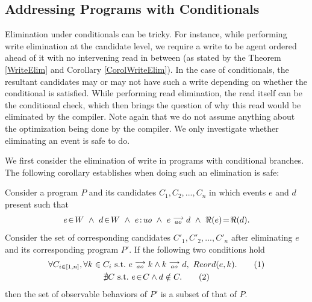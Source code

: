 \subsection{Addressing Programs with Conditionals}
    
    Elimination under conditionals can be tricky. 
    For instance, while performing write elimination at the candidate level, we require a write to be agent ordered ahead of it with no intervening read in between (as stated by the Theorem \ref{WriteElim} and Corollary \ref{CorolWriteElim}).
    In the case of conditionals, the resultant candidates may or may not have such a write depending on whether the conditional is satisfied. 
    While performing read elimination, the read itself can be the conditional check, which then brings the question of why this read would be eliminated by the compiler.
    Note again that we do not assume anything about the optimization being done by the compiler. 
    We only investigate whether eliminating an event is safe to do.  

    We first consider the elimination of write in programs with conditional branches. 
    The following corollary establishes when doing such an elimination is safe: 
    \begin{corollary}
        \label{WriteElimCond}
        Consider a program $P$ and its candidates $C_1, C_2, ... , C_n$ in which events $e$ and $d$ present such that 
        \begin{align*}
            \event{e}{W} \ \wedge \ \event{d}{W} \ \wedge \ \et{e}{uo} \ \wedge \ \reln{e}{ao}{d} \ \wedge \ \Re(e)\!=\!\Re(d).
        \end{align*} 
        Consider the set of corresponding candidates $C'_1, C'_2, ... , C'_n$ after eliminating $e$ and its corresponding program $P'$. If the following two conditions hold
        \begin{gather}
            \forall C_{i \in [1,n]}, \forall k \in C_i \ \text{s.t.} \ \reln{e}{ao}{k} \wedge \reln{k}{ao}{d}, \    
            Reord(e,k). \tag{1} \label{elim:cond_write1}\\   
            \nexists C \ \text{s.t.} \ \event{e}{C} \wedge d \notin C. \tag{2} \label{elim:cond_write2}
        \end{gather}
        then the set of observable behaviors of $P'$ is a subset of that of $P$.
    \end{corollary}

